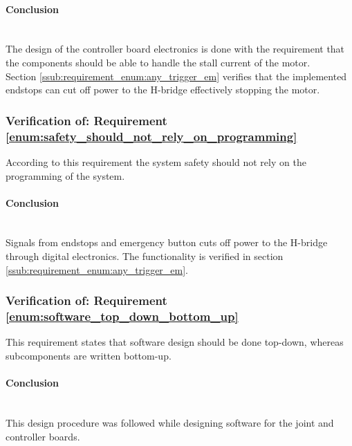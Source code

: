 \paragraph{Conclusion}~\\
The design of the controller board electronics is done with the requirement that the components should be able to handle the stall current of the motor.
\\
Section \ref{ssub:requirement_enum:any_trigger_em} verifies that the implemented endstops can cut off power to the H-bridge effectively stopping the motor.

\subsubsection{Verification of: Requirement \ref{enum:safety_should_not_rely_on_programming}} %
\label{sub:verification_of_requirement_enum:safety_should_not_rely_on_programming}
According to this requirement the system safety should not rely on the programming of the system.

\paragraph{Conclusion}~\\
Signals from endstops and emergency button cuts off power to the H-bridge through digital electronics.
The functionality is verified in section \ref{ssub:requirement_enum:any_trigger_em}.

\subsubsection{Verification of: Requirement \ref{enum:software_top_down_bottom_up}} %
\label{sub:verification_of_requirement_enum:software_top_down_bottom_up}
This requirement states that software design should be done top-down, whereas subcomponents are written bottom-up.

\paragraph{Conclusion}~\\
This design procedure was followed while designing software for the joint and controller boards.